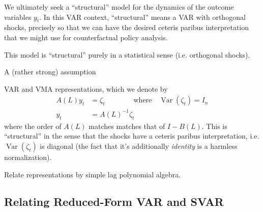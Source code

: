 \documentclass[aspectratio=169, handout]{beamer}
\newcommand{\Var}{\operatorname{Var}}
\begin{document}
{\footnotesize
\begin{frame}
We ultimately seek a ``\alert{structural}'' model for the dynamics of
the outcome variables $y_t$.
In this VAR context, ``structural'' means a VAR with
\alert{orthogonal shocks}, precisely so that we can have the desired
\alert{ceteris paribus} interpretation that we might use for
counterfactual policy analysis.

This model is ``structural'' purely in a statistical sense (i.e.
orthogonal shocks).

A (rather strong) assumption 

VAR and VMA representations, which
we denote by
\begin{align*}
  A(L)y_t &= \zeta_t
  \quad
  \quad
  \qquad\text{where}\quad
  \Var(\zeta_t) = I_n
  \\
  y_t &= A(L)^{-1}\zeta_t
\end{align*}
where the order of $A(L)$ matches matches that of $I-B(L)$.
This is ``structural'' in the sense that the shocks have a
\alert{ceteris paribus} interpretation, i.e. $\Var(\zeta_t)$ is
\alert{diagonal} (the fact that it's additionally \emph{identity} is a
harmless normalization).

Relate representations by simple lag polynomial algebra.
\end{frame}
}

\subsection{Relating Reduced-Form VAR and SVAR}
\end{document}
